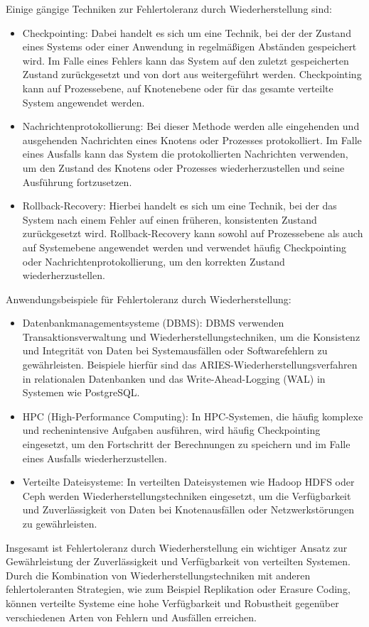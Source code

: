 \documentclass[../vs-script-first-v01.tex]{subfiles}
\begin{document}
Einige gängige Techniken zur Fehlertoleranz durch Wiederherstellung sind:
\begin{itemize}
\item Checkpointing: Dabei handelt es sich um eine Technik, bei der der Zustand eines Systems oder einer Anwendung in regelmäßigen Abständen gespeichert wird. Im Falle eines Fehlers kann das System auf den zuletzt gespeicherten Zustand zurückgesetzt und von dort aus weitergeführt werden. Checkpointing kann auf Prozessebene, auf Knotenebene oder für das gesamte verteilte System angewendet werden.
\item Nachrichtenprotokollierung: Bei dieser Methode werden alle eingehenden und ausgehenden Nachrichten eines Knotens oder Prozesses protokolliert. Im Falle eines Ausfalls kann das System die protokollierten Nachrichten verwenden, um den Zustand des Knotens oder Prozesses wiederherzustellen und seine Ausführung fortzusetzen.
\item Rollback-Recovery: Hierbei handelt es sich um eine Technik, bei der das System nach einem Fehler auf einen früheren, konsistenten Zustand zurückgesetzt wird. Rollback-Recovery kann sowohl auf Prozessebene als auch auf Systemebene angewendet werden und verwendet häufig Checkpointing oder Nachrichtenprotokollierung, um den korrekten Zustand wiederherzustellen.
\end{itemize}  
Anwendungsbeispiele für Fehlertoleranz durch Wiederherstellung:
\begin{itemize}
\item Datenbankmanagementsysteme (DBMS): DBMS verwenden Transaktionsverwaltung und Wiederherstellungstechniken, um die Konsistenz und Integrität von Daten bei Systemausfällen oder Softwarefehlern zu gewährleisten. Beispiele hierfür sind das ARIES-Wiederherstellungsverfahren in relationalen Datenbanken und das Write-Ahead-Logging (WAL) in Systemen wie PostgreSQL.
\item HPC (High-Performance Computing): In HPC-Systemen, die häufig komplexe und rechenintensive Aufgaben ausführen, wird häufig Checkpointing eingesetzt, um den Fortschritt der Berechnungen zu speichern und im Falle eines Ausfalls wiederherzustellen.
\item Verteilte Dateisysteme: In verteilten Dateisystemen wie Hadoop HDFS oder Ceph werden Wiederherstellungstechniken eingesetzt, um die Verfügbarkeit und Zuverlässigkeit von Daten bei Knotenausfällen oder Netzwerkstörungen zu gewährleisten.
\end{itemize} 
Insgesamt ist Fehlertoleranz durch Wiederherstellung ein wichtiger Ansatz zur Gewährleistung der Zuverlässigkeit und Verfügbarkeit von verteilten Systemen. Durch die Kombination von Wiederherstellungstechniken mit anderen fehlertoleranten Strategien, wie zum Beispiel Replikation oder Erasure Coding, können verteilte Systeme eine hohe Verfügbarkeit und Robustheit gegenüber verschiedenen Arten von Fehlern und Ausfällen erreichen.
\end{document}
